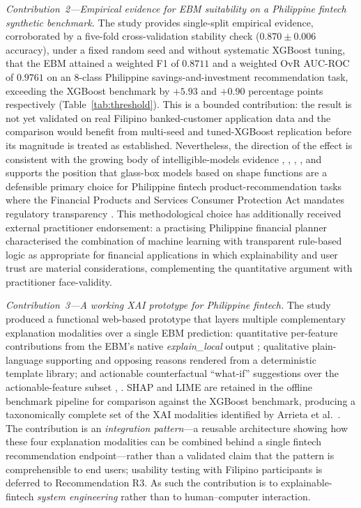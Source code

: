 \documentclass{icsthesis}
\begin{document}
\begin{mainmatter}
				\textit{Contribution~2---Empirical evidence for EBM suitability on a Philippine fintech synthetic benchmark.} The study provides single-split empirical evidence, corroborated by a five-fold cross-validation stability check ($0.870 \pm 0.006$ accuracy), under a fixed random seed and without systematic XGBoost tuning, that the EBM attained a weighted F1 of $0.8711$ and a weighted OvR AUC-ROC of $0.9761$ on an 8-class Philippine savings-and-investment recommendation task, exceeding the XGBoost benchmark by $+5.93$ and $+0.90$ percentage points respectively (Table~\ref{tab:threshold}). This is a bounded contribution: the result is not yet validated on real Filipino banked-customer application data and the comparison would benefit from multi-seed and tuned-XGBoost replication \cite{ref68} before its magnitude is treated as established. Nevertheless, the direction of the effect is consistent with the growing body of intelligible-models evidence \cite{ref15}, \cite{ref48}, \cite{ref49}, \cite{ref50}, and supports the position that glass-box models based on shape functions are a defensible primary choice for Philippine fintech product-recommendation tasks where the Financial Products and Services Consumer Protection Act \cite{ref44} mandates regulatory transparency \cite{ref51}. This methodological choice has additionally received external practitioner endorsement: a practising Philippine financial planner characterised the combination of machine learning with transparent rule-based logic as appropriate for financial applications in which explainability and user trust are material considerations, complementing the quantitative argument with practitioner face-validity.

				\textit{Contribution~3---A working XAI prototype for Philippine fintech.} The study produced a functional web-based prototype that layers multiple complementary explanation modalities over a single EBM prediction: quantitative per-feature contributions from the EBM's native \emph{explain\_local} output \cite{ref15}; qualitative plain-language supporting and opposing reasons rendered from a deterministic template library; and actionable counterfactual ``what-if'' suggestions over the actionable-feature subset \cite{ref20}, \cite{ref86}. SHAP \cite{ref18} and LIME \cite{ref19} are retained in the offline benchmark pipeline for comparison against the XGBoost benchmark, producing a taxonomically complete set of the XAI modalities identified by Arrieta et al.\ \cite{ref17}. The contribution is an \emph{integration pattern}---a reusable architecture showing how these four explanation modalities can be combined behind a single fintech recommendation endpoint---rather than a validated claim that the pattern is comprehensible to end users; usability testing with Filipino participants is deferred to Recommendation R3. As such the contribution is to explainable-fintech \emph{system engineering} rather than to human--computer interaction.


\end{mainmatter}
\end{document}
